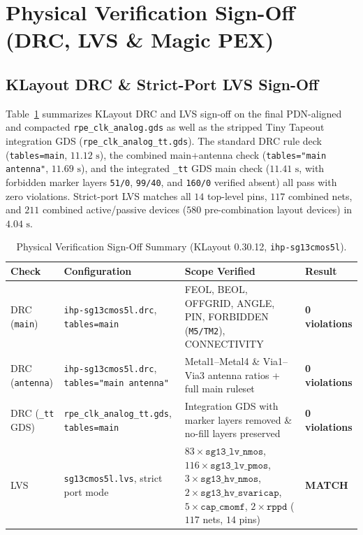 \documentclass[10pt,a4paper]{article}
\begin{document}
\section{Physical Verification Sign-Off (DRC, LVS \& Magic PEX)}
\label{sec:signoff}

\subsection{KLayout DRC \& Strict-Port LVS Sign-Off}
Table~\ref{tab:signoff} summarizes KLayout DRC and LVS sign-off on the final PDN-aligned and compacted \texttt{rpe\_clk\_analog.gds} as well as the stripped Tiny Tapeout integration GDS (\texttt{rpe\_clk\_analog\_tt.gds}). The standard DRC rule deck (\texttt{tables=main}, $11.12\text{ s}$), the combined main+antenna check (\texttt{tables="main antenna"}, $11.69\text{ s}$), and the integrated \texttt{\_tt} GDS main check ($11.41\text{ s}$, with forbidden marker layers \texttt{51/0}, \texttt{99/40}, and \texttt{160/0} verified absent) all pass with zero violations. Strict-port LVS matches all $14$ top-level pins, $117$ combined nets, and $211$ combined active/passive devices ($580$ pre-combination layout devices) in $4.04\text{ s}$.

\begin{table}[H]
\centering
\caption{Physical Verification Sign-Off Summary (KLayout 0.30.12, \texttt{ihp-sg13cmos5l}).}
\label{tab:signoff}
\footnotesize
\setlength{\tabcolsep}{4pt}
\begin{tabularx}{\textwidth}{@{}ll >{\raggedright\arraybackslash}X l@{}}
\toprule
\textbf{Check} & \textbf{Configuration} & \textbf{Scope Verified} & \textbf{Result} \\
\midrule
DRC (\texttt{main}) & \texttt{ihp-sg13cmos5l.drc}, \texttt{tables=main} & FEOL, BEOL, OFFGRID, ANGLE, PIN, FORBIDDEN (\texttt{M5/TM2}), CONNECTIVITY & \textbf{\textcolor{PassGreen}{0 violations}} \\
DRC (\texttt{antenna}) & \texttt{ihp-sg13cmos5l.drc}, \texttt{tables="main antenna"} & Metal1--Metal4 \& Via1--Via3 antenna ratios + full main ruleset & \textbf{\textcolor{PassGreen}{0 violations}} \\
DRC (\texttt{\_tt} GDS) & \texttt{rpe\_clk\_analog\_tt.gds}, \texttt{tables=main} & Integration GDS with marker layers removed \& no-fill layers preserved & \textbf{\textcolor{PassGreen}{0 violations}} \\
LVS & \texttt{sg13cmos5l.lvs}, strict port mode & $83\times\texttt{sg13\_lv\_nmos}$, $116\times\texttt{sg13\_lv\_pmos}$, $3\times\texttt{sg13\_hv\_nmos}$, $2\times\texttt{sg13\_hv\_svaricap}$, $5\times\texttt{cap\_cmomf}$, $2\times\texttt{rppd}$ ($117$ nets, $14$ pins) & \textbf{\textcolor{PassGreen}{MATCH}} \\
\bottomrule
\end{tabularx}
\end{table}
\end{document}
